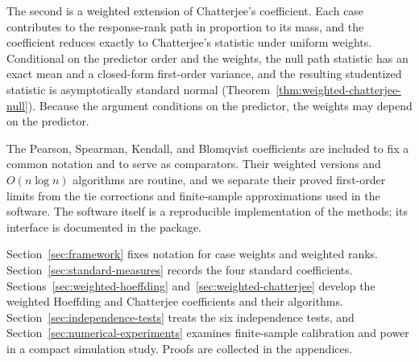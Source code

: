The second is a weighted extension of Chatterjee's coefficient. Each case
contributes to the response-rank path in proportion to its mass, and the
coefficient reduces exactly to Chatterjee's statistic under uniform weights.
Conditional on the predictor order and the weights, the null path statistic
has an exact mean and a closed-form first-order variance, and the resulting
studentized statistic is asymptotically standard normal
(Theorem~\ref{thm:weighted-chatterjee-null}). Because the argument conditions
on the predictor, the weights may depend on the predictor.

The Pearson, Spearman, Kendall, and Blomqvist coefficients are included to fix
a common notation and to serve as comparators. Their weighted versions and
$O(n\log n)$ algorithms are routine, and we separate their proved first-order
limits from the tie corrections and finite-sample approximations used in the
software. The software itself is a reproducible implementation of the
methods; its interface is documented in the package.

Section~\ref{sec:framework} fixes notation for case weights and weighted
ranks. Section~\ref{sec:standard-measures} records the four standard
coefficients. Sections~\ref{sec:weighted-hoeffding}
and~\ref{sec:weighted-chatterjee} develop the weighted Hoeffding and
Chatterjee coefficients and their algorithms.
Section~\ref{sec:independence-tests} treats the six independence tests, and
Section~\ref{sec:numerical-experiments} examines finite-sample calibration and
power in a compact simulation study. Proofs are collected in the appendices.
